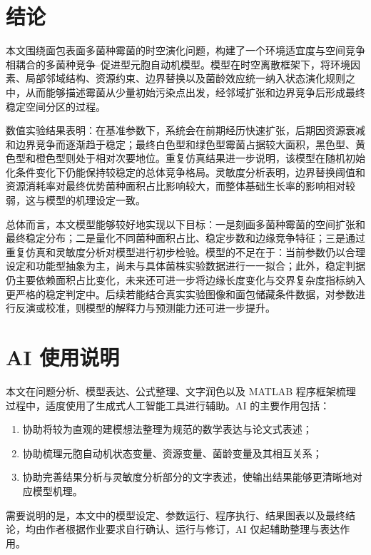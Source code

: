 \documentclass[12pt,a4paper]{ctexart}
\begin{document}
\section{结论}

本文围绕面包表面多菌种霉菌的时空演化问题，构建了一个环境适宜度与空间竞争相耦合的多菌种竞争--促进型元胞自动机模型。模型在时空离散框架下，将环境因素、局部邻域结构、资源约束、边界替换以及菌龄效应统一纳入状态演化规则之中，从而能够描述霉菌从少量初始污染点出发，经邻域扩张和边界竞争后形成最终稳定空间分区的过程。

数值实验结果表明：在基准参数下，系统会在前期经历快速扩张，后期因资源衰减和边界竞争而逐渐趋于稳定；最终白色型和绿色型霉菌占据较大面积，黑色型、黄色型和橙色型则处于相对次要地位。重复仿真结果进一步说明，该模型在随机初始化条件变化下仍能保持较稳定的总体竞争格局。灵敏度分析表明，边界替换阈值和资源消耗率对最终优势菌种面积占比影响较大，而整体基础生长率的影响相对较弱，这与模型的机理设定一致。

总体而言，本文模型能够较好地实现以下目标：一是刻画多菌种霉菌的空间扩张和最终稳定分布；二是量化不同菌种面积占比、稳定步数和边缘竞争特征；三是通过重复仿真和灵敏度分析对模型进行初步检验。模型的不足在于：当前参数仍以合理设定和功能型抽象为主，尚未与具体菌株实验数据进行一一拟合；此外，稳定判据仍主要依赖面积占比变化，未来还可进一步将边缘长度变化与交界复杂度指标纳入更严格的稳定判定中。后续若能结合真实实验图像和面包储藏条件数据，对参数进行反演或校准，则模型的解释力与预测能力还可进一步提升。


\appendix

\section{AI 使用说明}

本文在问题分析、模型表达、公式整理、文字润色以及 MATLAB 程序框架梳理过程中，适度使用了生成式人工智能工具进行辅助。AI 的主要作用包括：
\begin{enumerate}
    \item 协助将较为直观的建模想法整理为规范的数学表达与论文式表述；
    \item 协助梳理元胞自动机状态变量、资源变量、菌龄变量及其相互关系；
    \item 协助完善结果分析与灵敏度分析部分的文字表述，使输出结果能够更清晰地对应模型机理。
\end{enumerate}
需要说明的是，本文中的模型设定、参数运行、程序执行、结果图表以及最终结论，均由作者根据作业要求自行确认、运行与修订，AI 仅起辅助整理与表达作用。
\end{document}
